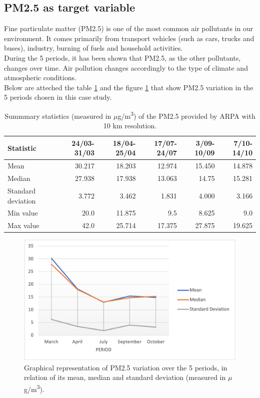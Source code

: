 \subsection{PM2.5 as target variable}
Fine particulate matter (PM2.5) is one of the most common air pollutants in our environment. 
It comes primarily from transport vehicles (such as cars, trucks and buses), industry, burning of fuels and household activities. \\
During the 5 periods, it has been shown that PM2.5, as the other pollutants, changes over time. Air pollution changes accordingly to the type of climate and atmospheric conditions.\\
Below are atteched the table \ref{tab:statspm25} and the figure \ref{fig:graphstatspm2.5} that show PM2.5 variation in the 5 periods chosen in this case study.
\begin{table}[H]
\centering
\begin{tabular}{lrrrrr}
\toprule
 Statistic &  24/03-31/03 &  18/04-25/04 &  17/07-24/07 &  3/09-10/09 &  7/10-14/10 \\
\midrule
  Mean  &        30.217  &         18.203  &         12.974 &       15.450 &       14.878 \\
Median  &        27.938 &        17.938 &        13.063 &       14.75 &       15.281 \\
 Standard deviation &        3.772 &        3.462 &        1.831 &       4.000 &       3.166 \\
  Min value &        20.0  &        11.875 &        9.5 &        8.625 &       9.0 \\
  Max value &        42.0 &        25.714 &        17.375 &        27.875 &       19.625 \\
\bottomrule
\end{tabular}
\caption{Summmary statistics (measured in $\mu$g/m\textsuperscript{3}) of the PM2.5 provided by ARPA with 10 km resolution.}
\label{tab:statspm25}
\end{table}
\begin{figure}[H]
    \centering
    \includegraphics[scale=0.8]{images/pm25_values.png}
    \caption{Graphical representation of PM2.5 variation over the 5 periods, in relation of its mean, median and standard deviation (measured in $\mu$g/m\textsuperscript{3}).}
    \label{fig:graphstatspm2.5}
\end{figure}
